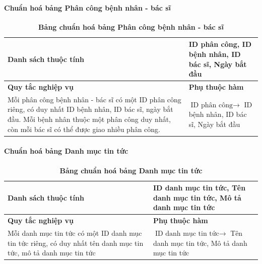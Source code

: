 \paragraph{Chuẩn hoá bảng Phân công bệnh nhân - bác sĩ}
\mbox{}
\begin{table}[H]
  \caption{\bfseries \fontsize{12pt}{0pt}\selectfont Bảng chuẩn hoá bảng Phân công bệnh nhân - bác sĩ}
  \centering
  \begin{tabularx}{0.9\textwidth}{|X|X|}
    \hline
    \textbf{Danh sách thuộc tính} & ID phân công, ID bệnh nhân, ID bác sĩ, Ngày bắt đầu \\
    \hline
    \textbf{Quy tắc nghiệp vụ} & \textbf{Phụ thuộc hàm} \\
    \hline
    Mỗi phân công bệnh nhân - bác sĩ có một ID phân công riêng, có duy nhất ID bệnh nhân, ID bác sĩ, ngày bắt đầu.
    Mỗi bệnh nhân thuộc một phân công duy nhất, còn mỗi bác sĩ có thể được giao nhiều phân công.
    & \parbox[t]{\linewidth}{$\text{ID phân công} \rightarrow$ ID bệnh nhân, ID bác sĩ, Ngày bắt đầu} \\
    \hline
     \\
     \\
    \hline
  \end{tabularx}
\end{table}

\paragraph{Chuẩn hoá bảng Danh mục tin tức}
\mbox{}
\begin{table}[H]
  \caption{\bfseries \fontsize{12pt}{0pt}\selectfont Bảng chuẩn hoá bảng Danh mục tin tức}
  \centering
  \begin{tabularx}{0.9\textwidth}{|X|X|}
    \hline
    \textbf{Danh sách thuộc tính} & ID danh mục tin tức, Tên danh mục tin tức, Mô tả danh mục tin tức \\
    \hline
    \textbf{Quy tắc nghiệp vụ} & \textbf{Phụ thuộc hàm} \\
    \hline
    Mỗi danh mục tin tức có một ID danh mục tin tức riêng, có duy nhất tên danh mục tin tức, mô tả danh mục tin tức
    & \parbox[t]{\linewidth}{$\text{ID danh mục tin tức} \rightarrow$ Tên danh mục tin tức, Mô tả danh mục tin tức} \\
    \hline
     \\
     \\
    \hline
  \end{tabularx}
\end{table}

